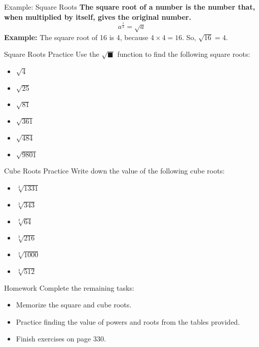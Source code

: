 \documentclass{beamer}
\begin{document}
\begin{frame}{\huge Example: Square Roots}
  \textbf{The square root of a number is the number that, when multiplied by itself, gives the original number.}
  \[
  a^{\frac{1}{2}} = \sqrt{a}
  \]
  \textbf{Example:} The square root of 16 is 4, because \(4 \times 4 = 16\). So, \(\sqrt{16} = 4\).
\end{frame}

\begin{frame}{\huge Square Roots Practice}
Use the $\sqrt{\blacksquare}$ function to find the following square roots:
\begin{multicols}{3}
\begin{itemize}
    \item $\sqrt{4}$
    \item $\sqrt{25}$
    \item $\sqrt{81}$
    \item $\sqrt{361}$
    \item $\sqrt{484}$
    \item $\sqrt{9801}$
\end{itemize}
\end{multicols}
\end{frame}

\begin{frame}{\huge Cube Roots Practice}
Write down the value of the following cube roots:
\begin{multicols}{3}
\begin{itemize}
    \item $\sqrt[3]{1331}$
    \item $\sqrt[3]{343}$
    \item $\sqrt[3]{64}$
    \item $\sqrt[3]{216}$
    \item $\sqrt[3]{1000}$
    \item $\sqrt[3]{512}$
\end{itemize}
\end{multicols}
\end{frame}

\begin{frame}{\huge Homework}
Complete the remaining tasks:
\begin{itemize}
    \item Memorize the square and cube roots.
    \item Practice finding the value of powers and roots from the tables provided.
    \item Finish exercises on page 330.
\end{itemize}
\end{frame}
\end{document}
